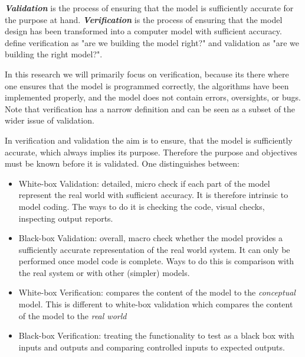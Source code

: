 
\textbf{\textit{Validation}} is the process of ensuring that the model is sufficiently accurate for the purpose at hand. \textbf{\textit{Verification}} is the process of ensuring that the model design has been transformed into a computer model with sufficient accuracy. \cite{balci_verification_1998} define verification as "are we building the model right?" and validation as "are we building the right model?".

In this research we will primarily focus on verification, because its there where one ensures that the model is programmed correctly, the algorithms have been implemented properly, and the model does not contain errors, oversights, or bugs. Note that verification has a narrow definition and can be seen as a subset of the wider issue of validation. 

In verification and validation the aim is to ensure, that the model is sufficiently accurate, which always implies its purpose. Therefore the purpose and objectives must be known before it is validated. One distinguishes between:

\begin{itemize}
	\item White-box Validation: detailed, micro check if each part of the model represent the real world with sufficient accuracy. It is therefore intrinsic to model coding. The ways to do it is checking the code, visual checks, inspecting output reports. 
	\item Black-box Validation: overall, macro check whether the model provides a sufficiently accurate representation of the real world system. It can only be performed once model code is complete. Ways to do this is comparison with the real system or with other (simpler) models.

	\item White-box Verification: compares the content of the model to the \textit{conceptual} model. This is different to white-box validation which compares the content of the model to the \textit{real world}
	\item Black-box Verification: treating the functionality to test as a black box with inputs and outputs and comparing controlled inputs to expected outputs.

\end{itemize}

